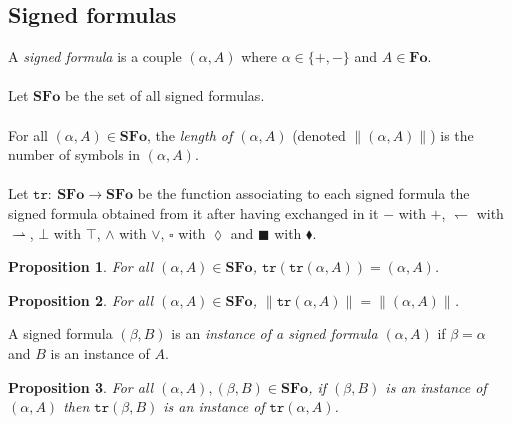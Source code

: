 \documentclass[draft]{article}
\newtheorem{proposition}{Proposition}
\def\Fo{\mathbf{Fo}}
\def\SFo{\mathbf{SFo}}
\begin{document}
\subsection{Signed formulas}
%
%
A {\em signed formula}\/ is a couple $(\alpha,A)$ where $\alpha{\in}\{+,-\}$ and $A{\in}\Fo$.
%
%
\\
\\
%
%
Let $\SFo$ be the set of all signed formulas.
%
%
\\
\\
%
%
For all $(\alpha,A){\in}\SFo$, the {\em length of $(\alpha,A)$}\/ (denoted ${\parallel}(\alpha,A){\parallel}$) is the number of symbols in $(\alpha,A)$.
%
%
\\
\\
%
%
Let $\mathtt{tr}:\ \SFo{\longrightarrow}\SFo$ be the function associating to each signed formula the signed formula obtained from it after having exchanged in it $-$ with $+$, $\leftharpoondown$ with $\rightharpoonup$, $\bot$ with $\top$, $\wedge$ with $\vee$, $\square$ with $\lozenge$ and $\blacksquare$ with $\blacklozenge$.
%
%
\begin{proposition}\label{Proposition:for:all:formulas:2}
%
%
For all $(\alpha,A){\in}\SFo$, $\mathtt{tr}(\mathtt{tr}(\alpha,A)){=}(\alpha,A)$.
%
%
\end{proposition}
%
%
\begin{proposition}\label{Proposition:for:all:formulas:1}
%
%
For all $(\alpha,A){\in}\SFo$, ${\parallel}\mathtt{tr}(\alpha,A){\parallel}{=}{\parallel}(\alpha,A){\parallel}$.
%
%
\end{proposition}
%
%
%
%
%
%
%
%
A signed formula $(\beta,B)$ is an {\em instance of a signed formula $(\alpha,A)$}\/ if $\beta{=}\alpha$ and $B$ is an instance of $A$.
%
%
\begin{proposition}\label{Proposition:for:all:formulas:if:is:an:instance:of:then:is:an:instance:of}
%
%
For all $(\alpha,A),(\beta,B){\in}\SFo$, if $(\beta,B)$ is an instance of $(\alpha,A)$ then $\mathtt{tr}(\beta,B)$ is an instance of $\mathtt{tr}(\alpha,A)$.
%
%
\end{proposition}
%
%
%
%
\end{document}
